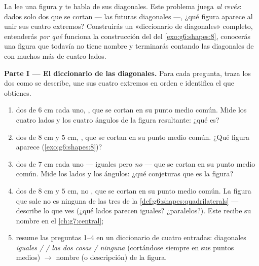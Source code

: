 \begin{problem}
\label{pb:g6:shapes:1}
La  lee una figura y te habla de
sus diagonales. Este problema juega \emph{al revés}: dados
solo dos  que se cortan --- las futuras diagonales ---, ¿qué figura
aparece al unir sus cuatro extremos? Construirás un
«diccionario de diagonales» completo, entenderás \emph{por qué} funciona la
construcción del  del \cref{exo:g6:shapes:8}, conocerás una figura que
todavía no tiene nombre y terminarás contando las diagonales de 
con muchos más de cuatro lados.

\medskip
\noindent\textbf{Parte I --- El diccionario de las diagonales.}
Para cada pregunta, traza los dos  como se describe, une sus
cuatro extremos en orden e identifica el  que obtienes.
\begin{enumerate}
  \item dos  de $6$ cm cada uno, , que se cortan en
        su punto medio común. Mide los cuatro lados y los
        cuatro ángulos de la figura resultante: ¿qué es?
  \item dos  de $8$ cm y $5$ cm, ,
        que se cortan en su punto medio común. ¿Qué figura aparece
        (\cref{exo:g6:shapes:8})?
  \item dos  de $7$ cm cada uno --- iguales pero \emph{no}
         --- que se cortan en su punto medio común.
        Mide los lados y los ángulos: ¿qué conjeturas que es la
        figura?
  \item dos  de $8$ cm y $5$ cm, no ,
        que se cortan en su punto medio común. La figura que sale no es
        ninguna de las tres de la
        \cref{def:g6:shapes:quadrilaterals} --- describe lo que
        ves (¿qué lados parecen iguales? ¿paralelos?). Este
         recibe su nombre en el \cref{ch:g7:central};
  \item resume las preguntas 1--4 en un diccionario de cuatro
        entradas: diagonales \emph{iguales /  / las dos cosas /
        ninguna} (cortándose siempre en sus puntos medios)
        $\rightarrow$ nombre (o descripción) de la figura.
\end{enumerate}


\end{problem}
